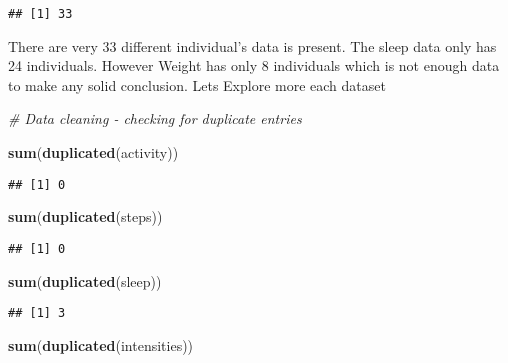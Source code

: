 \documentclass[
]{article}
\newenvironment{Shaded}{\begin{snugshade}}{\end{snugshade}}
\newcommand{\CommentTok}[1]{\textcolor[rgb]{0.56,0.35,0.01}{\textit{#1}}}
\newcommand{\FunctionTok}[1]{\textcolor[rgb]{0.13,0.29,0.53}{\textbf{#1}}}
\newcommand{\NormalTok}[1]{#1}
\newcommand{\SpecialCharTok}[1]{\textcolor[rgb]{0.81,0.36,0.00}{\textbf{#1}}}
\begin{document}
\begin{Shaded}
\end{Shaded}

\begin{verbatim}
## [1] 33
\end{verbatim}

There are very 33 different individual's data is present. The sleep data
only has 24 individuals. However Weight has only 8 individuals which is
not enough data to make any solid conclusion. Lets Explore more each
dataset

\begin{Shaded}
\begin{Highlighting}[]
\CommentTok{\# Data cleaning {-} checking for duplicate entries}

\FunctionTok{sum}\NormalTok{(}\FunctionTok{duplicated}\NormalTok{(activity))}
\end{Highlighting}
\end{Shaded}

\begin{verbatim}
## [1] 0
\end{verbatim}

\begin{Shaded}
\begin{Highlighting}[]
\FunctionTok{sum}\NormalTok{(}\FunctionTok{duplicated}\NormalTok{(steps))}
\end{Highlighting}
\end{Shaded}

\begin{verbatim}
## [1] 0
\end{verbatim}

\begin{Shaded}
\begin{Highlighting}[]
\FunctionTok{sum}\NormalTok{(}\FunctionTok{duplicated}\NormalTok{(sleep))}
\end{Highlighting}
\end{Shaded}

\begin{verbatim}
## [1] 3
\end{verbatim}

\begin{Shaded}
\begin{Highlighting}[]
\FunctionTok{sum}\NormalTok{(}\FunctionTok{duplicated}\NormalTok{(intensities))}
\end{Highlighting}
\end{Shaded}
\end{document}
